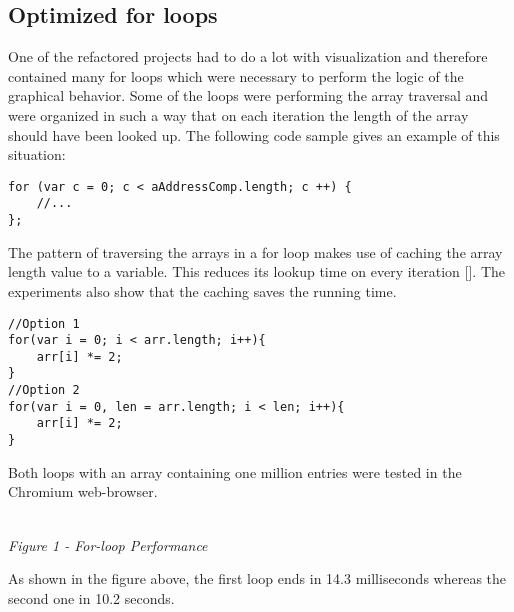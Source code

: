 \documentclass{bioinfo}
\begin{document}
\begin{methods}
\subsection{Optimized for loops}

One of the refactored projects had to do a lot with visualization and therefore contained many for loops which were necessary to perform the logic of the graphical behavior. Some of the loops were performing the array traversal and were organized in such a way that on each iteration the length of the array should have been looked up. The following code sample gives an example of this situation:
\begin{lstlisting}
for (var c = 0; c < aAddressComp.length; c ++) {
    //...
};
\end{lstlisting}
The pattern of traversing the arrays in a for loop makes use of caching the array length value to a variable. This reduces its lookup time on every iteration [\citealp{crockford}]. The experiments also show that the caching saves the running time.
\begin{lstlisting}
//Option 1
for(var i = 0; i < arr.length; i++){
	arr[i] *= 2;
}
//Option 2
for(var i = 0, len = arr.length; i < len; i++){
	arr[i] *= 2;
}
\end{lstlisting}
Both loops with an array containing one million entries were tested in the Chromium web-browser.\\
\begin{center}
\begin{bchart}[step=1,max=15,width=7cm]
    \smallskip
\end{bchart}\\
\textit{Figure 1 - For-loop Performance}
\end{center}
As shown in the figure above, the first loop ends in 14.3 milliseconds whereas the second one in 10.2 seconds.


\end{methods}
\end{document}
